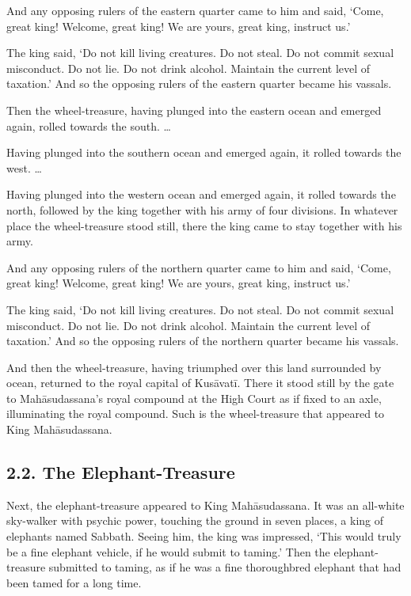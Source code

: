 \documentclass[12pt,openany]{book}%
\begin{document}
And any opposing rulers of the eastern quarter came to him and said, ‘Come, great king! Welcome, great king! We are yours, great king, instruct us.’ 

The king said, ‘Do not kill living creatures. Do not steal. Do not commit sexual misconduct. Do not lie. Do not drink alcohol. Maintain the current level of taxation.’ And so the opposing rulers of the eastern quarter became his vassals. 

Then the wheel-treasure, having plunged into the eastern ocean and emerged again, rolled towards the south. … 

Having plunged into the southern ocean and emerged again, it rolled towards the west. … 

Having plunged into the western ocean and emerged again, it rolled towards the north, followed by the king together with his army of four divisions. In whatever place the wheel-treasure stood still, there the king came to stay together with his army. 

And any opposing rulers of the northern quarter came to him and said, ‘Come, great king! Welcome, great king! We are yours, great king, instruct us.’ 

The king said, ‘Do not kill living creatures. Do not steal. Do not commit sexual misconduct. Do not lie. Do not drink alcohol. Maintain the current level of taxation.’ And so the opposing rulers of the northern quarter became his vassals. 

And then the wheel-treasure, having triumphed over this land surrounded by ocean, returned to the royal capital of \textsanskrit{Kusāvatī}. There it stood still by the gate to \textsanskrit{Mahāsudassana}’s royal compound at the High Court as if fixed to an axle, illuminating the royal compound. Such is the wheel-treasure that appeared to King \textsanskrit{Mahāsudassana}. 

\subsection*{2.2. The Elephant-Treasure }

Next, the elephant-treasure appeared to King \textsanskrit{Mahāsudassana}. It was an all-white sky-walker with psychic power, touching the ground in seven places, a king of elephants named Sabbath. Seeing him, the king was impressed, ‘This would truly be a fine elephant vehicle, if he would submit to taming.’ Then the elephant-treasure submitted to taming, as if he was a fine thoroughbred elephant that had been tamed for a long time. 
\end{document}
